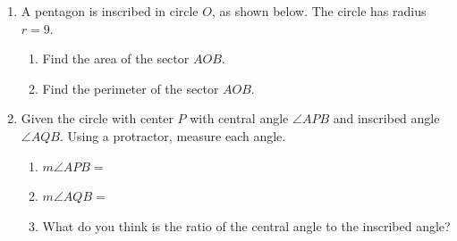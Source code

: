 \documentclass[12pt, twoside]{article}
\begin{document}
\begin{enumerate}
\newpage
\item A pentagon is inscribed in circle $O$, as shown below. The circle has radius $r=9$.
    \begin{multicols}{2}
    \raggedcolumns
    \begin{enumerate}
      \item Find the area of the sector $AOB$. \vspace{3cm}
      \item Find the perimeter of the sector $AOB$. %
    \end{enumerate}
    \end{multicols}  \vspace{1cm}

    \item Given the circle with center $P$ with central angle $\angle APB$ and inscribed angle $\angle AQB$. Using a protractor, measure each angle.
  \begin{multicols}{2}
    \raggedcolumns
    \begin{enumerate}
      \item $m\angle APB=$ \vspace{0.7cm}
      \item $m\angle AQB=$ \vspace{0.7cm}
      \item What do you think is the ratio of the central angle to the inscribed angle?
    \end{enumerate}
  \end{multicols}


\end{enumerate}
\end{document}
